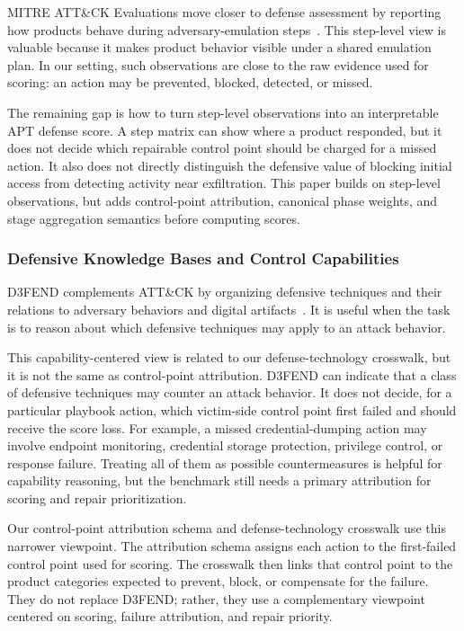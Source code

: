 MITRE ATT\&CK Evaluations move closer to defense assessment by reporting how products behave during adversary-emulation steps~\cite{mitreAttackEvaluations}. This step-level view is valuable because it makes product behavior visible under a shared emulation plan. In our setting, such observations are close to the raw evidence used for scoring: an action may be prevented, blocked, detected, or missed.

The remaining gap is how to turn step-level observations into an interpretable APT defense score. A step matrix can show where a product responded, but it does not decide which repairable control point should be charged for a missed action. It also does not directly distinguish the defensive value of blocking initial access from detecting activity near exfiltration. This paper builds on step-level observations, but adds control-point attribution, canonical phase weights, and stage aggregation semantics before computing scores.

\subsubsection{Defensive Knowledge Bases and Control Capabilities}

D3FEND complements ATT\&CK by organizing defensive techniques and their relations to adversary behaviors and digital artifacts~\cite{mitreD3FEND,kaloroumakis2021d3fend}. It is useful when the task is to reason about which defensive techniques may apply to an attack behavior.

This capability-centered view is related to our defense-technology crosswalk, but it is not the same as control-point attribution. D3FEND can indicate that a class of defensive techniques may counter an attack behavior. It does not decide, for a particular playbook action, which victim-side control point first failed and should receive the score loss. For example, a missed credential-dumping action may involve endpoint monitoring, credential storage protection, privilege control, or response failure. Treating all of them as possible countermeasures is helpful for capability reasoning, but the benchmark still needs a primary attribution for scoring and repair prioritization.

Our control-point attribution schema and defense-technology crosswalk use this narrower viewpoint. The attribution schema assigns each action to the first-failed control point used for scoring. The crosswalk then links that control point to the product categories expected to prevent, block, or compensate for the failure. They do not replace D3FEND; rather, they use a complementary viewpoint centered on scoring, failure attribution, and repair priority.

